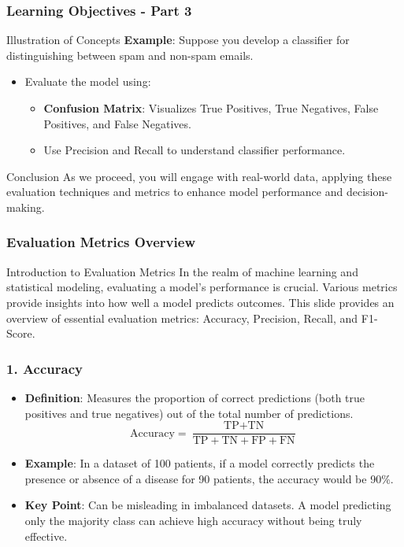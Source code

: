 \documentclass[aspectratio=169]{beamer}
\begin{document}
\begin{frame}[fragile]
    \frametitle{Learning Objectives - Part 3}
    
    \begin{block}{Illustration of Concepts}
        \textbf{Example}: Suppose you develop a classifier for distinguishing between spam and non-spam emails.
        
        \begin{itemize}
            \item Evaluate the model using:
                \begin{itemize}
                    \item \textbf{Confusion Matrix}: Visualizes True Positives, True Negatives, False Positives, and False Negatives.
                    \item Use Precision and Recall to understand classifier performance.
                \end{itemize}
        \end{itemize}
    \end{block}
    
    \begin{block}{Conclusion}
        As we proceed, you will engage with real-world data, applying these evaluation techniques and metrics to enhance model performance and decision-making.
    \end{block}
\end{frame}

\begin{frame}[fragile]
    \frametitle{Evaluation Metrics Overview}
    \begin{block}{Introduction to Evaluation Metrics}
        In the realm of machine learning and statistical modeling, evaluating a model's performance is crucial. Various metrics provide insights into how well a model predicts outcomes. This slide provides an overview of essential evaluation metrics: Accuracy, Precision, Recall, and F1-Score.
    \end{block}
\end{frame}

\begin{frame}[fragile]
    \frametitle{1. Accuracy}
    \begin{itemize}
        \item \textbf{Definition}: Measures the proportion of correct predictions (both true positives and true negatives) out of the total number of predictions.
        \begin{equation}
            \text{Accuracy} = \frac{\text{TP} + \text{TN}}{\text{TP} + \text{TN} + \text{FP} + \text{FN}}
        \end{equation}
        \item \textbf{Example}: In a dataset of 100 patients, if a model correctly predicts the presence or absence of a disease for 90 patients, the accuracy would be 90\%.
        \item \textbf{Key Point}: Can be misleading in imbalanced datasets. A model predicting only the majority class can achieve high accuracy without being truly effective.
    \end{itemize}
\end{frame}
\end{document}
